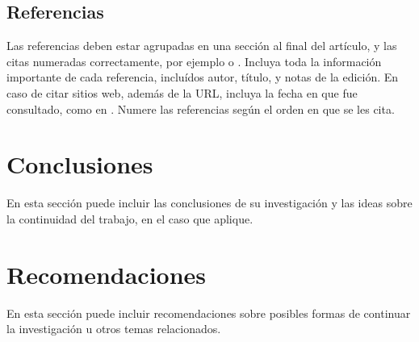 \documentclass[a4paper,10pt,twocolumn]{article}
\begin{document}
	\subsection{Referencias}
  	Las referencias deben estar agrupadas en una sección al final del artículo,
  	y las citas numeradas correctamente, por ejemplo \cite{knuth} o \cite{goedel}.
  	Incluya toda la información importante de cada referencia, incluídos autor,
  	título, y notas de la edición. En caso de citar sitios web, además
  	de la URL, incluya la fecha en que fue consultado, como en \cite{wiki}. Numere 
  	las referencias según el orden en que se les cita.




\section{Conclusiones}\label{sec:conc}

  En esta sección puede incluir las conclusiones de su investigación y las ideas
  sobre la continuidad del trabajo, en el caso que aplique.




\section{Recomendaciones}\label{sec:rec}

  En esta sección puede incluir recomendaciones sobre posibles formas de continuar
  la investigación u otros temas relacionados.








\label{end}
\end{document}
